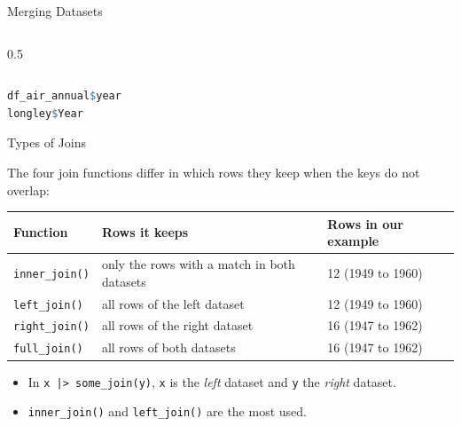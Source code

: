 \documentclass[9pt,aspectratio=169]{beamer}
\begin{document}
\begin{frame}[fragile]{Merging Datasets}
\begin{columns}[c]
\begin{column}{0.5\textwidth}
  \end{column}
\end{columns}
%
\vspace{5mm}
\begin{lstlisting}[language=R, basicstyle=\ttfamily\scriptsize]
df_air_annual$year
longley$Year
\end{lstlisting}
\end{frame}

\begin{frame}{Types of Joins}
\begin{center}
  The four join functions differ in which rows they keep when the keys do not overlap:
\end{center}
\vspace{5mm}
\begin{center}
\small
\begin{tabular}{lll}
\toprule
\textbf{Function} & \textbf{Rows it keeps} & \textbf{Rows in our example} \\
\midrule
\texttt{inner\_join()} & only the rows with a match in both datasets & 12 (1949 to 1960) \\
\texttt{left\_join()} & all rows of the left dataset & 12 (1949 to 1960) \\
\texttt{right\_join()} & all rows of the right dataset & 16 (1947 to 1962) \\
\texttt{full\_join()} & all rows of both datasets & 16 (1947 to 1962) \\
\bottomrule
\end{tabular}
\end{center}
\vspace{5mm}
\begin{itemize}
  \item In \texttt{x |> some\_join(y)}, \texttt{x} is the \textit{left} dataset and \texttt{y} the \textit{right} dataset.
  \item \color{red}\texttt{inner\_join()} and \texttt{left\_join()} are the most used.
\end{itemize}
\end{frame}
\end{document}
